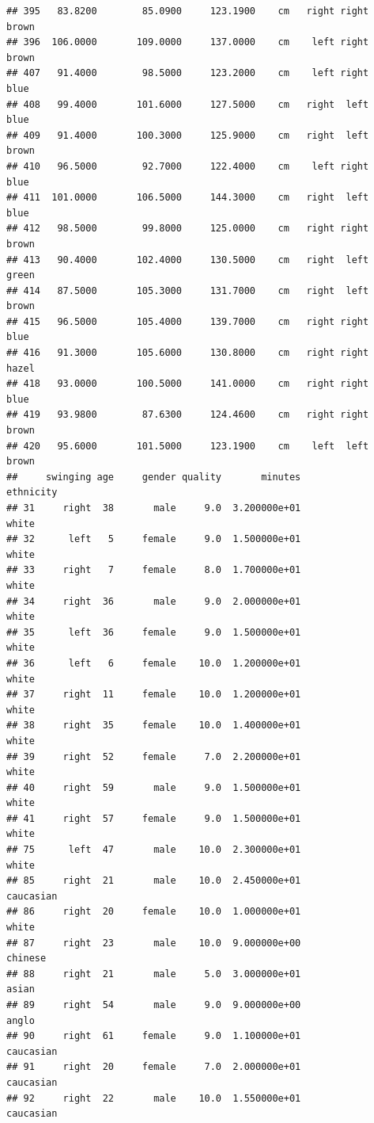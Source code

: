 \documentclass[]{article}
\begin{document}
\begin{verbatim}
## 395   83.8200        85.0900     123.1900    cm   right right      brown
## 396  106.0000       109.0000     137.0000    cm    left right      brown
## 407   91.4000        98.5000     123.2000    cm    left right       blue
## 408   99.4000       101.6000     127.5000    cm   right  left       blue
## 409   91.4000       100.3000     125.9000    cm   right  left      brown
## 410   96.5000        92.7000     122.4000    cm    left right       blue
## 411  101.0000       106.5000     144.3000    cm   right  left       blue
## 412   98.5000        99.8000     125.0000    cm   right right      brown
## 413   90.4000       102.4000     130.5000    cm   right  left      green
## 414   87.5000       105.3000     131.7000    cm   right  left      brown
## 415   96.5000       105.4000     139.7000    cm   right right       blue
## 416   91.3000       105.6000     130.8000    cm   right right      hazel
## 418   93.0000       100.5000     141.0000    cm   right right       blue
## 419   93.9800        87.6300     124.4600    cm   right right      brown
## 420   95.6000       101.5000     123.1900    cm    left  left      brown
##     swinging age     gender quality       minutes          ethnicity
## 31     right  38       male     9.0  3.200000e+01              white
## 32      left   5     female     9.0  1.500000e+01              white
## 33     right   7     female     8.0  1.700000e+01              white
## 34     right  36       male     9.0  2.000000e+01              white
## 35      left  36     female     9.0  1.500000e+01              white
## 36      left   6     female    10.0  1.200000e+01              white
## 37     right  11     female    10.0  1.200000e+01              white
## 38     right  35     female    10.0  1.400000e+01              white
## 39     right  52     female     7.0  2.200000e+01              white
## 40     right  59       male     9.0  1.500000e+01              white
## 41     right  57     female     9.0  1.500000e+01              white
## 75      left  47       male    10.0  2.300000e+01              white
## 85     right  21       male    10.0  2.450000e+01          caucasian
## 86     right  20     female    10.0  1.000000e+01              white
## 87     right  23       male    10.0  9.000000e+00            chinese
## 88     right  21       male     5.0  3.000000e+01              asian
## 89     right  54       male     9.0  9.000000e+00              anglo
## 90     right  61     female     9.0  1.100000e+01          caucasian
## 91     right  20     female     7.0  2.000000e+01          caucasian
## 92     right  22       male    10.0  1.550000e+01          caucasian

\end{verbatim}
\end{document}
